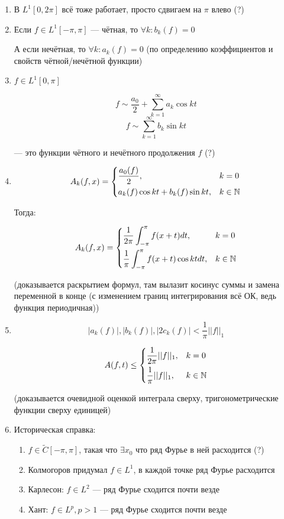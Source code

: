 \documentclass{article}
\begin{document}
\begin{enumerate}
    \item В $L^1[0, 2\pi]$ всё тоже работает, просто сдвигаем на $\pi$ влево (?)
    \item Если $f \in L^1[-\pi, \pi]$ --- чётная, то $\forall k : b_k(f) = 0$
    
    А если нечётная, то $\forall k : a_k(f) = 0$ (по определению коэффициентов и свойств чётной/нечётной функции)

    \item $f \in L^1[0, \pi]$
    
    \[f \sim \frac{a_0}{2} + \sum_{k = 1}^{\infty} a_k \cos kt\]
    \[f \sim \sum_{k = 1}^{\infty} b_k \sin kt\]

    --- это функции чётного и нечётного продолжения $f$ (?)

    \item \[A_k(f, x) = \begin{dcases}
        \frac{a_0(f)}{2}, & k = 0 \\
        a_k(f) \cos kt + b_k(f) \sin kt, & k \in \mathbb{N}
    \end{dcases}\]

    Тогда:

    \[A_k(f, x) = \begin{dcases}
        \frac{1}{2\pi} \int_{-\pi}^{\pi} f(x + t) dt, & k = 0 \\
        \frac{1}{\pi} \int_{-\pi}^{\pi} f(x + t) \cos kt dt, & k \in \mathbb{N}
    \end{dcases}\]

    (доказывается раскрытием формул, там вылазит косинус суммы и замена переменной в конце (с изменением границ интегрирования всё ОК, ведь функция периодичная))

    \item 
    
    \[|a_k(f)|, |b_k(f)|, |2c_k(f)| < \frac{1}{\pi}||f||_1\]

    \[A(f, t) \le \begin{dcases}
        \frac{1}{2\pi}||f||_1, & k = 0 \\
        \frac{1}{\pi} ||f||_1, & k \in \mathbb{N}
    \end{dcases}\]

    (доказывается очевидной оценкой интеграла сверху, тригонометрические функции сверху единицей)

    \item Историческая справка:
    \begin{enumerate}
        \item $f \in \tilde{C}[-\pi, \pi]$, такая что $\exists x_0$ что ряд Фурье в ней расходится (?)
        \item Колмогоров придумал $f \in L^1$, в каждой точке ряд Фурье расходится
        \item Карлесон: $f \in L^2$ --- ряд Фурье сходится почти везде
        \item Хант: $f \in L^p, p > 1$ --- ряд Фурье сходится почти везде
    \end{enumerate}
\end{enumerate}
\end{document}
